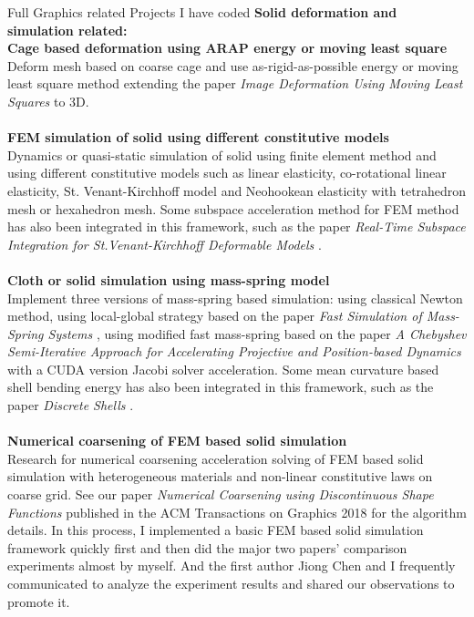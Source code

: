 \documentclass{article} %
\begin{document}
% 
\begin{section}{Full Graphics related Projects I have coded}
  \textbf{Solid deformation and simulation related:}\\
         {\bf Cage based deformation using ARAP energy or moving least square}\\Deform mesh based on coarse cage and use as-rigid-as-possible energy or moving least square method extending the paper \emph{Image Deformation Using Moving Least Squares} \cite{schaefer2006image} to 3D.\\
         \\{\bf FEM simulation of solid using different constitutive models}\\Dynamics or quasi-static simulation of solid using finite element method and using different constitutive models such as linear elasticity, co-rotational linear elasticity, St. Venant-Kirchhoff model and Neohookean elasticity with tetrahedron mesh or hexahedron mesh. Some subspace acceleration method for FEM method has also been integrated in this framework, such as the paper \textit{Real-Time Subspace Integration for St.Venant-Kirchhoff Deformable Models} \cite{barbivc2005real}. \\
         \\{\bf Cloth or solid simulation using mass-spring model}\\Implement three versions of mass-spring based simulation: using classical Newton method, using local-global strategy based on the paper \textit{Fast Simulation of Mass-Spring Systems} \cite{liu2013fast}, using modified fast mass-spring based on the paper \textit{A Chebyshev Semi-Iterative Approach for Accelerating Projective and Position-based Dynamics} \cite{wang2015chebyshev} with a CUDA version Jacobi solver acceleration. Some mean curvature based shell bending energy has also been integrated in this framework, such as the paper \textit{Discrete Shells} \cite{grinspun2003discrete}.\\
         \\{\bf Numerical coarsening of FEM based solid simulation}\\ Research for numerical coarsening acceleration solving of FEM based solid simulation with heterogeneous materials and non-linear constitutive laws on coarse grid. See our paper \emph{Numerical Coarsening using Discontinuous Shape Functions} \cite{chen2018numerical} published in the ACM Transactions on Graphics 2018 for the algorithm details. In this process, I implemented a basic FEM based solid simulation framework quickly first and then did the major two papers' comparison experiments almost by myself. And the first author Jiong Chen and I frequently communicated to analyze the experiment results and shared our observations to promote it.\\\\

\end{section}
\end{document}
